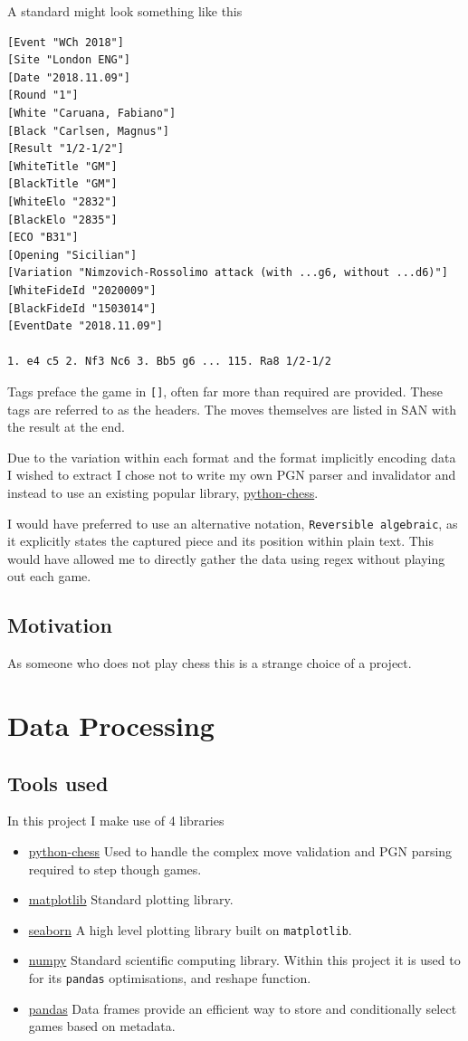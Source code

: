 \documentclass[11pt]{article}
\begin{document}
A standard might look something like this
\begin{verbatim}
[Event "WCh 2018"]
[Site "London ENG"]
[Date "2018.11.09"]
[Round "1"]
[White "Caruana, Fabiano"]
[Black "Carlsen, Magnus"]
[Result "1/2-1/2"]
[WhiteTitle "GM"]
[BlackTitle "GM"]
[WhiteElo "2832"]
[BlackElo "2835"]
[ECO "B31"]
[Opening "Sicilian"]
[Variation "Nimzovich-Rossolimo attack (with ...g6, without ...d6)"]
[WhiteFideId "2020009"]
[BlackFideId "1503014"]
[EventDate "2018.11.09"]

1. e4 c5 2. Nf3 Nc6 3. Bb5 g6 ... 115. Ra8 1/2-1/2
\end{verbatim}
Tags preface the game in \texttt{[]}, often far more than required are provided. These tags are referred to as the headers. The moves themselves are listed in SAN with the result at the end.

Due to the variation within each format and the format implicitly encoding data I wished to extract I chose not to write my own PGN parser and invalidator and instead to use an existing popular library, \href{https://github.com/niklasf/python-chess}{python-chess}.

I would have preferred to use an alternative notation, \texttt{Reversible algebraic}, as it explicitly states the captured piece and its position within plain text. This would have allowed me to directly gather the data using regex without playing out each game.
\subsection{Motivation}
\label{sec:orgf700212}
As someone who does not play chess this is a strange choice of a project.
\section{Data Processing}
\label{sec:orgfb6978a}
\subsection{Tools used}
\label{sec:orgdb78b19}
In this project I make use of 4 libraries
\begin{itemize}
\item \href{https://github.com/niklasf/python-chess}{python-chess}
Used to handle the complex move validation and PGN parsing required to step though games.
\item \href{https://matplotlib.org/}{matplotlib}
Standard plotting library.
\item \href{https://seaborn.pydata.org/}{seaborn}
A high level plotting library built on \texttt{matplotlib}.
\item \href{https://numpy.org/}{numpy}
Standard scientific computing library. Within this project it is used to for its \texttt{pandas} optimisations, and reshape function.
\item \href{https://pandas.pydata.org/}{pandas}
Data frames provide an efficient way to store and conditionally select games based on metadata.
\end{itemize}
\end{document}
